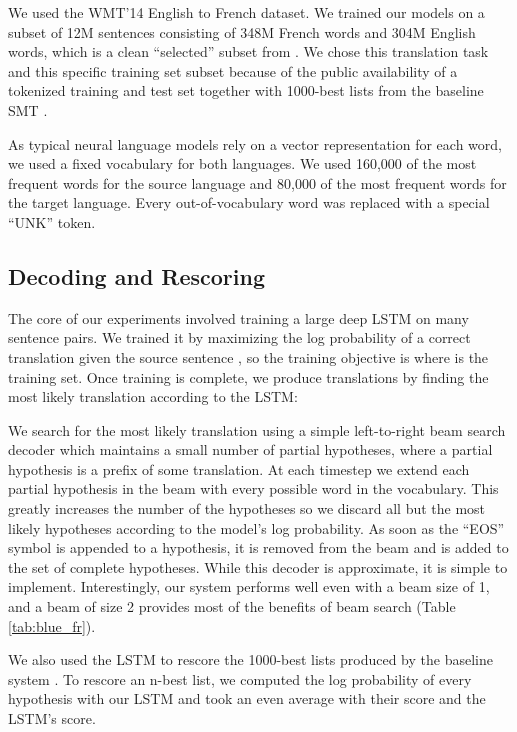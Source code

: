 \documentclass{article} \usepackage{nips14submit_e}
\begin{document}
We used the WMT'14 English to French dataset.  We trained our models
on a subset of 12M sentences consisting of 348M French words and 304M
English words, which is a clean ``selected'' subset from
\cite{wmt14_en_fr}. We chose this translation task and this specific
training set subset because of the public availability of a tokenized training and
test set together with 1000-best lists from the baseline SMT 
\cite{wmt14_en_fr}.

As typical neural language models rely on a vector representation for
each word, we used a fixed vocabulary for both languages.  We used
160,000 of the most frequent words for the source language and 80,000
of the most frequent words for the target language.  Every
out-of-vocabulary word was replaced with a special ``UNK'' token.  
 







\subsection{Decoding and Rescoring}

The core of our experiments involved training a large deep LSTM on
many sentence pairs. We trained it by maximizing the log
probability of a correct translation  given the source sentence
, so the training objective is
 where  is the training set.  Once training is complete, we produce
translations by finding the most likely translation according to
the LSTM:

We search for the most likely translation using a simple left-to-right
beam search decoder which maintains a small number  of partial
hypotheses, where a partial hypothesis is a prefix of some
translation.  At each timestep we extend each partial hypothesis in
the beam with every possible word in the vocabulary. This greatly
increases the number of the hypotheses so we discard all but the 
most likely hypotheses according to the model's log probability.  As soon
as the ``EOS'' symbol is appended to a hypothesis, it is removed from
the beam and is added to the set of complete hypotheses.  While this
decoder is approximate, it is simple to implement.  Interestingly, our
system performs well even with a beam size of 1, and a beam of
size 2 provides most of the benefits of beam search (Table
\ref{tab:blue_fr}).   



We also used the LSTM to rescore the 1000-best lists produced by the
baseline system \cite{wmt14_en_fr}.  To rescore an n-best list, we
computed the log probability of every hypothesis with our LSTM and
took an even average with their score and the LSTM's score.
\end{document}
